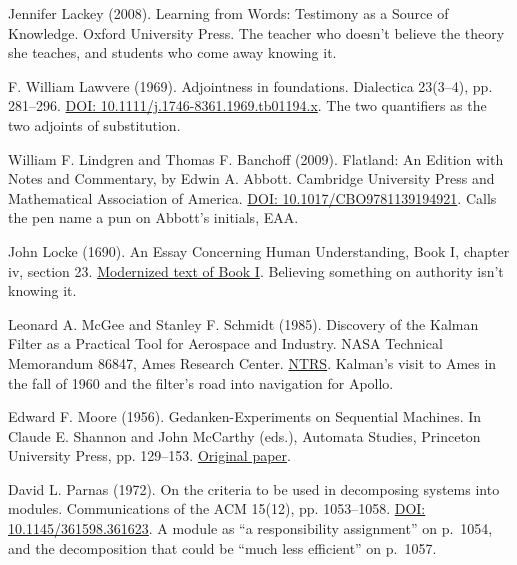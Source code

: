 \noindent Jennifer Lackey (2008). Learning from Words: Testimony as a Source of Knowledge. Oxford University Press. The teacher who doesn't believe the theory she teaches, and students who come away knowing it.
\par\medskip

\noindent F. William Lawvere (1969). Adjointness in foundations. Dialectica 23(3--4), pp. 281--296. \href{https://doi.org/10.1111/j.1746-8361.1969.tb01194.x}{DOI: 10.1111/j.1746-8361.1969.tb01194.x}. The two quantifiers as the two adjoints of substitution.
\par\medskip

\noindent William F. Lindgren and Thomas F. Banchoff (2009). Flatland: An Edition with Notes and Commentary, by Edwin A. Abbott. Cambridge University Press and Mathematical Association of America. \href{https://doi.org/10.1017/CBO9781139194921}{DOI: 10.1017/CBO9781139194921}. Calls the pen name a pun on Abbott's initials, EAA.
\par\medskip

\noindent John Locke (1690). An Essay Concerning Human Understanding, Book I, chapter iv, section 23. \href{https://www.earlymoderntexts.com/assets/pdfs/locke1690book1.pdf}{Modernized text of Book I}. Believing something on authority isn't knowing it.
\par\medskip

\noindent Leonard A. McGee and Stanley F. Schmidt (1985). Discovery of the Kalman Filter as a Practical Tool for Aerospace and Industry. NASA Technical Memorandum 86847, Ames Research Center. \href{https://ntrs.nasa.gov/citations/19860003843}{NTRS}. Kalman's visit to Ames in the fall of 1960 and the filter's road into navigation for Apollo.
\par\medskip

\noindent Edward F. Moore (1956). Gedanken-Experiments on Sequential Machines. In Claude E. Shannon and John McCarthy (eds.), Automata Studies, Princeton University Press, pp. 129--153. \href{https://www.cs.cmu.edu/~cdm/resources/Moore1956-gedanken-experiments.pdf}{Original paper}.
\par\medskip

\noindent David L. Parnas (1972). On the criteria to be used in decomposing systems into modules. Communications of the ACM 15(12), pp. 1053--1058. \href{https://doi.org/10.1145/361598.361623}{DOI: 10.1145/361598.361623}. A module as ``a responsibility assignment'' on p.~1054, and the decomposition that could be ``much less efficient'' on p.~1057.
\par\medskip

